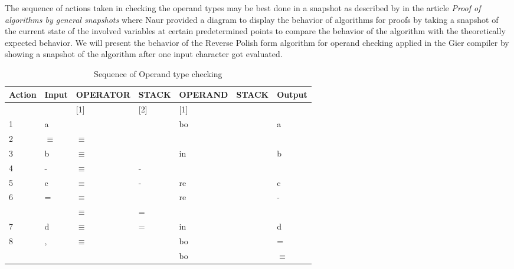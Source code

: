 \documentclass{article}
\begin{document}
The sequence of actions taken in checking the operand types may be best done in a snapshot as described by \cite{naur1966proof} in the article \textit{Proof of algorithms by general snapshots} where Naur provided a diagram to display the behavior of algorithms for proofs by taking a snapshot of the current state of the involved variables at certain predetermined points to compare the behavior of the algorithm with the theoretically expected behavior. We will present the behavior of the Reverse Polish form algorithm for operand checking applied in the Gier compiler by showing a snapshot of the algorithm after one input character got evaluated.
\\
\begin{table}[H]
	\centering
		\begin{tabular}{llll|ll|l|}
			\hline
			\multicolumn{1}{|l|}{Action} & \multicolumn{1}{l|}{Input}    & OPERATOR                      & STACK   & OPERAND & STACK & Output   \\ \hline
			\multicolumn{1}{|l|}{}       & \multicolumn{1}{l|}{}         & \multicolumn{1}{l|}{{[}1{]}}  & {[}2{]} & {[}1{]} &       &          \\ \hline
			\multicolumn{1}{|l|}{1}      & \multicolumn{1}{l|}{a}        & \multicolumn{1}{l|}{}         &         & bo      &       & a        \\ \hline
			\multicolumn{1}{|l|}{2}      & \multicolumn{1}{l|}{$\equiv$} & \multicolumn{1}{l|}{$\equiv$} &         &         &       &          \\ \hline
			\multicolumn{1}{|l|}{3}      & \multicolumn{1}{l|}{b}        & \multicolumn{1}{l|}{$\equiv$} &         & in      &       & b        \\ \hline
			\multicolumn{1}{|l|}{4}      & \multicolumn{1}{l|}{-}        & \multicolumn{1}{l|}{$\equiv$} & -       &         &       &          \\ \hline
			\multicolumn{1}{|l|}{5}      & \multicolumn{1}{l|}{c}        & \multicolumn{1}{l|}{$\equiv$} & -       & re      &       & c        \\ \hline
			\multicolumn{1}{|l|}{6}      & \multicolumn{1}{l|}{=}        & \multicolumn{1}{l|}{$\equiv$} &         & re      &       & -        \\ \hline
			& \multicolumn{1}{l|}{}         & \multicolumn{1}{l|}{$\equiv$} & =       &         &       &          \\ \hline
			\multicolumn{1}{|l|}{7}      & \multicolumn{1}{l|}{d}        & \multicolumn{1}{l|}{$\equiv$} & =       & in      &       & d        \\ \hline
			\multicolumn{1}{|l|}{8}      & \multicolumn{1}{l|}{,}        & \multicolumn{1}{l|}{$\equiv$} &         & bo      &       & =        \\ \hline
			&                               &                               &         & bo      &       & $\equiv$ \\ \cline{5-7} 
		\end{tabular}
	\caption{Sequence of Operand type checking}
	\label{tab:my-table}
\end{table}
\end{document}
